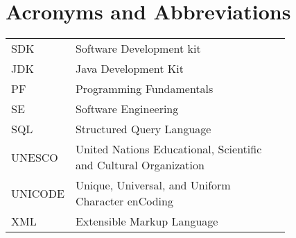 \chapter*{Acronyms and Abbreviations}

\begin{flushleft}
\begin{tabular}{l p{0.8\linewidth}}
SDK& Software Development kit\\
JDK	&Java Development Kit\\
PF	&Programming Fundamentals\\
SE	&Software Engineering\\
SQL	&Structured Query Language\\
UNESCO&	United Nations Educational, Scientific and Cultural Organization\\
UNICODE&	Unique, Universal, and Uniform Character enCoding\\
XML	&Extensible Markup Language\\

\end{tabular}
\end{flushleft}

